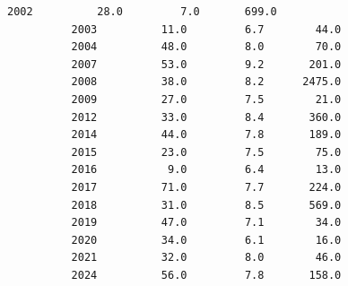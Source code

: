 \documentclass[11pt]{article}
\begin{document}
\begin{Verbatim}[commandchars=\\\{\}]
          2002          28.0         7.0       699.0   
          2003          11.0         6.7        44.0   
          2004          48.0         8.0        70.0   
          2007          53.0         9.2       201.0   
          2008          38.0         8.2      2475.0   
          2009          27.0         7.5        21.0   
          2012          33.0         8.4       360.0   
          2014          44.0         7.8       189.0   
          2015          23.0         7.5        75.0   
          2016           9.0         6.4        13.0   
          2017          71.0         7.7       224.0   
          2018          31.0         8.5       569.0   
          2019          47.0         7.1        34.0   
          2020          34.0         6.1        16.0   
          2021          32.0         8.0        46.0   
          2024          56.0         7.8       158.0   
          

\end{Verbatim}
\end{document}
